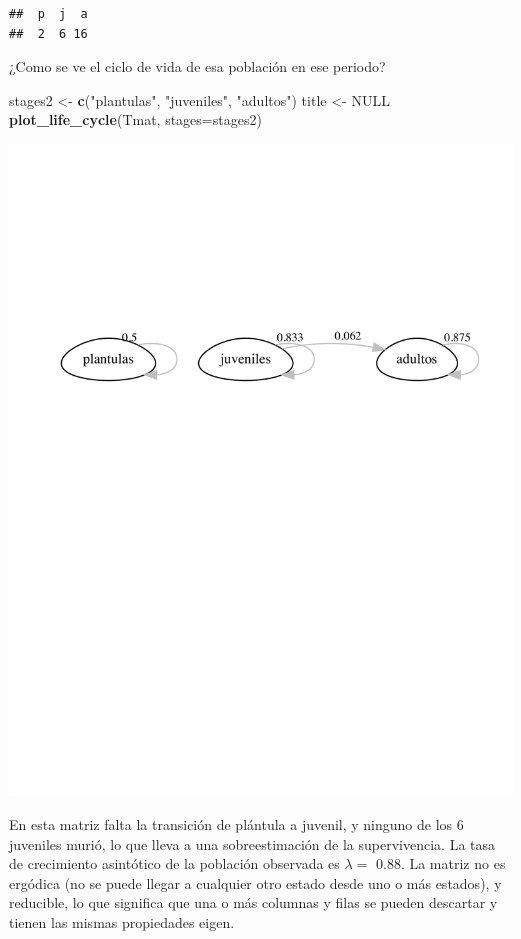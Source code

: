 \documentclass[
]{book}
\newenvironment{Shaded}{\begin{snugshade}}{\end{snugshade}}
\newcommand{\AttributeTok}[1]{\textcolor[rgb]{0.13,0.29,0.53}{#1}}
\newcommand{\ConstantTok}[1]{\textcolor[rgb]{0.56,0.35,0.01}{#1}}
\newcommand{\FunctionTok}[1]{\textcolor[rgb]{0.13,0.29,0.53}{\textbf{#1}}}
\newcommand{\NormalTok}[1]{#1}
\newcommand{\OtherTok}[1]{\textcolor[rgb]{0.56,0.35,0.01}{#1}}
\newcommand{\StringTok}[1]{\textcolor[rgb]{0.31,0.60,0.02}{#1}}
\theoremstyle{definition}
\theoremstyle{definition}
\theoremstyle{definition}
\theoremstyle{definition}
\theoremstyle{remark}
\begin{document}
\begin{verbatim}
##  p  j  a 
##  2  6 16
\end{verbatim}

¿Como se ve el ciclo de vida de esa población en ese periodo?

\begin{Shaded}
\begin{Highlighting}[]
\NormalTok{stages2 }\OtherTok{\textless{}{-}} \FunctionTok{c}\NormalTok{(}\StringTok{"plantulas"}\NormalTok{, }\StringTok{"juveniles"}\NormalTok{, }\StringTok{"adultos"}\NormalTok{)}
\NormalTok{title }\OtherTok{\textless{}{-}} \ConstantTok{NULL}
\FunctionTok{plot\_life\_cycle}\NormalTok{(Tmat, }\AttributeTok{stages=}\NormalTok{stages2)}
\end{Highlighting}
\end{Shaded}

\includegraphics{Diagnostico_Poblacional_files/figure-latex/chap7_11-1.pdf}

En esta matriz falta la transición de plántula a juvenil, y ninguno de los 6 juveniles murió, lo que lleva a una sobreestimación de la supervivencia. La tasa de crecimiento asintótico de la población observada es \(\lambda =\) 0.88. La matriz no es ergódica (no se puede llegar a cualquier otro estado desde uno o más estados), y reducible, lo que significa que una o más columnas y filas se pueden descartar y tienen las mismas propiedades eigen.
\end{document}
